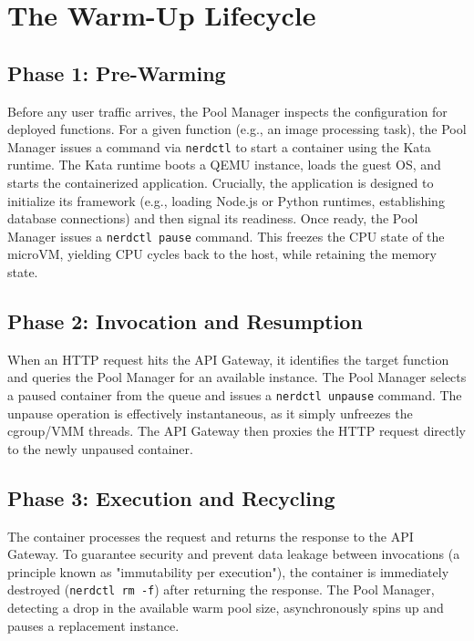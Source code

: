 \documentclass[12pt,a4paper]{report}
\begin{document}
\section{The Warm-Up Lifecycle}

\subsection{Phase 1: Pre-Warming}
Before any user traffic arrives, the Pool Manager inspects the configuration for deployed functions. For a given function (e.g., an image processing task), the Pool Manager issues a command via \texttt{nerdctl} to start a container using the Kata runtime.
The Kata runtime boots a QEMU instance, loads the guest OS, and starts the containerized application. Crucially, the application is designed to initialize its framework (e.g., loading Node.js or Python runtimes, establishing database connections) and then signal its readiness. Once ready, the Pool Manager issues a \texttt{nerdctl pause} command. This freezes the CPU state of the microVM, yielding CPU cycles back to the host, while retaining the memory state.

\subsection{Phase 2: Invocation and Resumption}
When an HTTP request hits the API Gateway, it identifies the target function and queries the Pool Manager for an available instance. The Pool Manager selects a paused container from the queue and issues a \texttt{nerdctl unpause} command. The unpause operation is effectively instantaneous, as it simply unfreezes the cgroup/VMM threads. The API Gateway then proxies the HTTP request directly to the newly unpaused container.

\subsection{Phase 3: Execution and Recycling}
The container processes the request and returns the response to the API Gateway. To guarantee security and prevent data leakage between invocations (a principle known as "immutability per execution"), the container is immediately destroyed (\texttt{nerdctl rm -f}) after returning the response. The Pool Manager, detecting a drop in the available warm pool size, asynchronously spins up and pauses a replacement instance.
\end{document}
